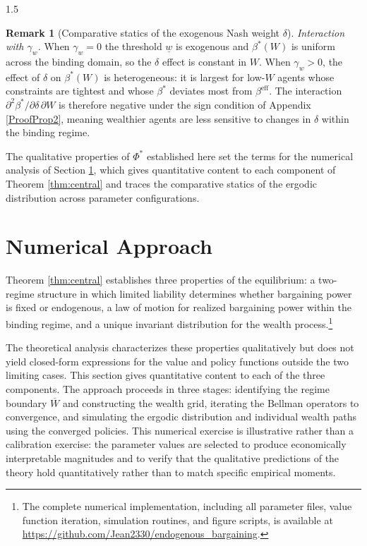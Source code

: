 \documentclass[12pt]{article}
\theoremstyle{definition}
\newtheorem{remark}{Remark}[section]
\theoremstyle{plain}
\begin{document}
\begin{spacing}{1.5}
\begin{remark}[Comparative statics of the exogenous Nash weight $\delta$]
\textit{Interaction with $\gamma_w$.} When $\gamma_w = 0$ the threshold $\underline{w}$ is exogenous and $\beta^*(W)$ is uniform across the binding domain, so the $\delta$ effect is constant in $W$. When $\gamma_w > 0$, the effect of $\delta$ on $\beta^*(W)$ is heterogeneous: it is largest for low-$W$ agents whose constraints are tightest and whose $\beta^*$ deviates most from $\beta^{\mathrm{eff}}$. The interaction $\partial^2\beta^*/\partial\delta\,\partial W$ is therefore negative under the sign condition of Appendix \ref{ProofProp2}, meaning wealthier agents are less sensitive to changes in $\delta$ within the binding regime.
\end{remark}

The qualitative properties of $\Phi^*$ established here set the terms for the numerical analysis of Section \ref{NumApproach}, which gives quantitative content to each component of Theorem \ref{thm:central} and traces the comparative statics of the ergodic distribution across parameter configurations.

\newpage
\section{Numerical Approach}\label{NumApproach}
 
Theorem \ref{thm:central} establishes three properties of the equilibrium: a two-regime structure in which limited liability determines whether bargaining power is fixed or endogenous, a law of motion for realized bargaining power within the binding regime, and a unique invariant distribution for the wealth process.\footnote{The complete numerical implementation, including all parameter files, value function iteration, simulation routines, and figure scripts, is available at \url{https://github.com/Jean2330/endogenous\_bargaining}.} 

The theoretical analysis characterizes these properties qualitatively but does not yield closed-form expressions for the value and policy functions outside the two limiting cases. This section gives quantitative content to each of the three components. The approach proceeds in three stages: identifying the regime boundary $\overline{W}$ and constructing the wealth grid, iterating the Bellman operators to convergence, and simulating the ergodic distribution and individual wealth paths using the converged policies. This numerical exercise is illustrative rather than a calibration exercise: the parameter values are selected to produce economically interpretable magnitudes and to verify that the qualitative predictions of the theory hold quantitatively rather than to match specific empirical moments.
 

\end{spacing}
\end{document}
